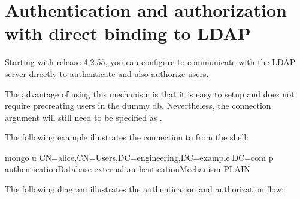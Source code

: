 \documentclass[letterpaper,10pt,english]{sphinxmanual}
\begin{document}
\section{Authentication and authorization with direct binding to LDAP}
\label{\detokenize{authorization:authentication-and-authorization-with-direct-binding-to-ldap}}\label{\detokenize{authorization:native-ldap}}
\sphinxAtStartPar
Starting with release 4.2.5\sphinxhyphen{}5, you can configure  to communicate with the LDAP server directly to authenticate and also authorize users.

\sphinxAtStartPar
The advantage of using this mechanism is that it is easy to setup and does not require pre\sphinxhyphen{}creating users  in the dummy  db. Nevertheless, the  connection argument will still need to be specified as .

\sphinxAtStartPar
The following example illustrates the connection to  from the  shell:

\begin{sphinxVerbatim}[commandchars=\\\{\}]
mongo \PYGZhy{}u \PYGZdq{}CN=alice,CN=Users,DC=engineering,DC=example,DC=com\PYGZdq{} \PYGZhy{}p \PYGZhy{}\PYGZhy{}authenticationDatabase \PYGZsq{}\PYGZdl{}external\PYGZsq{} \PYGZhy{}\PYGZhy{}authenticationMechanism PLAIN
\end{sphinxVerbatim}

\sphinxAtStartPar
The following diagram illustrates the authentication and authorization flow:
\end{document}

